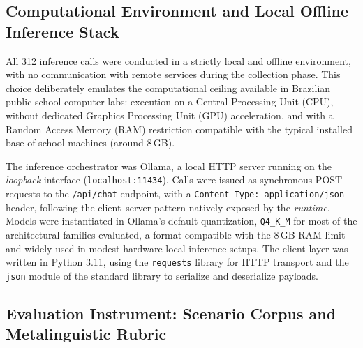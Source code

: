\documentclass{sbc2023}%
\begin{document}
\subsection{Computational Environment and Local Offline Inference Stack}

All 312 inference calls were conducted in a strictly local and offline environment, with no communication with remote services during the collection phase. This choice deliberately emulates the computational ceiling available in Brazilian public-school computer labs: execution on a Central Processing Unit (CPU), without dedicated Graphics Processing Unit (GPU) acceleration, and with a Random Access Memory (RAM) restriction compatible with the typical installed base of school machines (around 8\,GB).

The inference orchestrator was Ollama, a local HTTP server running on the \textit{loopback} interface (\texttt{localhost:11434}). Calls were issued as synchronous POST requests to the \texttt{/api/chat} endpoint, with a \texttt{Content-Type: application/json} header, following the client--server pattern natively exposed by the \textit{runtime}. Models were instantiated in Ollama's default quantization, \texttt{Q4\_K\_M} for most of the architectural families evaluated, a format compatible with the 8\,GB RAM limit and widely used in modest-hardware local inference setups. The client layer was written in Python 3.11, using the \texttt{requests} library for HTTP transport and the \texttt{json} module of the standard library to serialize and deserialize payloads.

\subsection{Evaluation Instrument: Scenario Corpus and Metalinguistic Rubric}
\label{sec:instrument}
\end{document}
